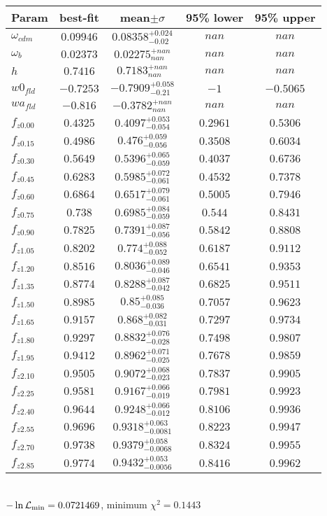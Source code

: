 \begin{tabular}{|l|c|c|c|c|} 
 \hline 
Param & best-fit & mean$\pm\sigma$ & 95\% lower & 95\% upper \\ \hline 
$\omega_{cdm }$ &$0.09946$ & $0.08358_{-0.02}^{+0.024}$ & $nan$ & $nan$ \\ 
$\omega_{b }$ &$0.02373$ & $0.02275_{nan}^{+nan}$ & $nan$ & $nan$ \\ 
$h$ &$0.7416$ & $0.7183_{nan}^{+nan}$ & $nan$ & $nan$ \\ 
$w0_{fld }$ &$-0.7253$ & $-0.7909_{-0.21}^{+0.058}$ & $-1$ & $-0.5065$ \\ 
$wa_{fld }$ &$-0.816$ & $-0.3782_{nan}^{+nan}$ & $nan$ & $nan$ \\ 
$f_{z0.00 }$ &$0.4325$ & $0.4097_{-0.054}^{+0.053}$ & $0.2961$ & $0.5306$ \\ 
$f_{z0.15 }$ &$0.4986$ & $0.476_{-0.056}^{+0.059}$ & $0.3508$ & $0.6034$ \\ 
$f_{z0.30 }$ &$0.5649$ & $0.5396_{-0.059}^{+0.065}$ & $0.4037$ & $0.6736$ \\ 
$f_{z0.45 }$ &$0.6283$ & $0.5985_{-0.061}^{+0.072}$ & $0.4532$ & $0.7378$ \\ 
$f_{z0.60 }$ &$0.6864$ & $0.6517_{-0.061}^{+0.079}$ & $0.5005$ & $0.7946$ \\ 
$f_{z0.75 }$ &$0.738$ & $0.6985_{-0.059}^{+0.084}$ & $0.544$ & $0.8431$ \\ 
$f_{z0.90 }$ &$0.7825$ & $0.7391_{-0.056}^{+0.087}$ & $0.5842$ & $0.8808$ \\ 
$f_{z1.05 }$ &$0.8202$ & $0.774_{-0.052}^{+0.088}$ & $0.6187$ & $0.9112$ \\ 
$f_{z1.20 }$ &$0.8516$ & $0.8036_{-0.046}^{+0.089}$ & $0.6541$ & $0.9353$ \\ 
$f_{z1.35 }$ &$0.8774$ & $0.8288_{-0.042}^{+0.087}$ & $0.6825$ & $0.9511$ \\ 
$f_{z1.50 }$ &$0.8985$ & $0.85_{-0.036}^{+0.085}$ & $0.7057$ & $0.9623$ \\ 
$f_{z1.65 }$ &$0.9157$ & $0.868_{-0.031}^{+0.082}$ & $0.7297$ & $0.9734$ \\ 
$f_{z1.80 }$ &$0.9297$ & $0.8832_{-0.028}^{+0.076}$ & $0.7498$ & $0.9807$ \\ 
$f_{z1.95 }$ &$0.9412$ & $0.8962_{-0.025}^{+0.071}$ & $0.7678$ & $0.9859$ \\ 
$f_{z2.10 }$ &$0.9505$ & $0.9072_{-0.023}^{+0.068}$ & $0.7837$ & $0.9905$ \\ 
$f_{z2.25 }$ &$0.9581$ & $0.9167_{-0.019}^{+0.066}$ & $0.7981$ & $0.9923$ \\ 
$f_{z2.40 }$ &$0.9644$ & $0.9248_{-0.012}^{+0.066}$ & $0.8106$ & $0.9936$ \\ 
$f_{z2.55 }$ &$0.9696$ & $0.9318_{-0.0081}^{+0.063}$ & $0.8223$ & $0.9947$ \\ 
$f_{z2.70 }$ &$0.9738$ & $0.9379_{-0.0068}^{+0.058}$ & $0.8324$ & $0.9955$ \\ 
$f_{z2.85 }$ &$0.9774$ & $0.9432_{-0.0056}^{+0.053}$ & $0.8416$ & $0.9962$ \\ 
\hline 
 \end{tabular} \\ 
$-\ln{\cal L}_\mathrm{min} =0.0721469$, minimum $\chi^2=0.1443$ \\ 

